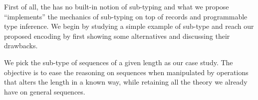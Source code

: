 % 
% 
% 
% 

First of all, the \mcbCIC{} has no built-in notion of sub-typing and
what we propose ``implements'' the mechanics of sub-typing on top
of records and programmable type inference.  We begin by studying a
simple example of sub-type and reach our proposed encoding by first
showing some alternatives and discussing their drawbacks.

We pick the sub-type of sequences of a given length as our case study.
The objective is to ease the reasoning on sequences when manipulated
by operations that alters the length in a known way, while retaining
all the theory we already have on general sequences.

